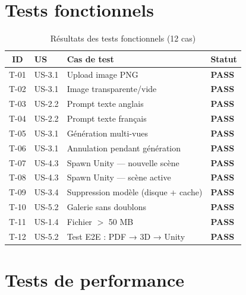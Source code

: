\documentclass[12pt,a4paper,oneside]{report}
\newcommand{\theadrow}{\rowcolor{tekupblue!12}}
\begin{document}
\section{Tests fonctionnels}

\begin{table}[H]
\centering
\caption{Résultats des tests fonctionnels (12 cas)}
\label{tab:tests}
\begin{tabularx}{\linewidth}{@{}clXl@{}}
\toprule
\theadrow
\textbf{ID} & \textbf{US} & \textbf{Cas de test} & \textbf{Statut} \\\midrule
T-01 & US-3.1 & Upload image PNG                        & \textcolor{crispgreen}{\textbf{PASS}} \\
T-02 & US-3.1 & Image transparente/vide                 & \textcolor{crispgreen}{\textbf{PASS}} \\
T-03 & US-2.2 & Prompt texte anglais                    & \textcolor{crispgreen}{\textbf{PASS}} \\
T-04 & US-2.2 & Prompt texte français                   & \textcolor{crispgreen}{\textbf{PASS}} \\
T-05 & US-3.1 & Génération multi-vues                   & \textcolor{crispgreen}{\textbf{PASS}} \\
T-06 & US-3.1 & Annulation pendant génération           & \textcolor{crispgreen}{\textbf{PASS}} \\
T-07 & US-4.3 & Spawn Unity --- nouvelle scène          & \textcolor{crispgreen}{\textbf{PASS}} \\
T-08 & US-4.3 & Spawn Unity --- scène active            & \textcolor{crispgreen}{\textbf{PASS}} \\
T-09 & US-3.4 & Suppression modèle (disque + cache)     & \textcolor{crispgreen}{\textbf{PASS}} \\
T-10 & US-5.2 & Galerie sans doublons                   & \textcolor{crispgreen}{\textbf{PASS}} \\
T-11 & US-1.4 & Fichier $>$ 50 MB                       & \textcolor{crispgreen}{\textbf{PASS}} \\
T-12 & US-5.2 & Test E2E : PDF → 3D → Unity             & \textcolor{crispgreen}{\textbf{PASS}} \\
\bottomrule
\end{tabularx}
\end{table}

\section{Tests de performance}
\end{document}
